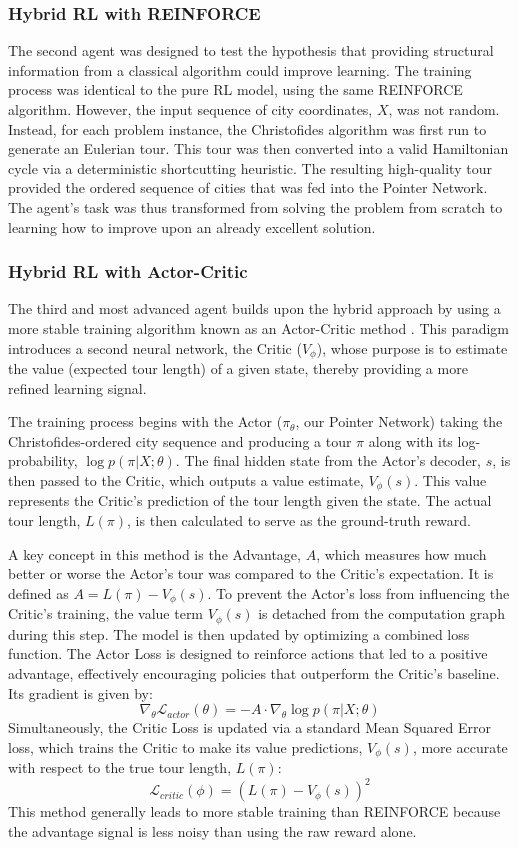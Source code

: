 \documentclass[12pt]{article}
\theoremstyle{remarkstyle}
\begin{document}
\subsubsection{Hybrid RL with REINFORCE}
The second agent was designed to test the hypothesis that providing structural information from a classical algorithm could improve learning. The training process was identical to the pure RL model, using the same REINFORCE algorithm. However, the input sequence of city coordinates, $X$, was not random. Instead, for each problem instance, the Christofides algorithm was first run to generate an Eulerian tour. This tour was then converted into a valid Hamiltonian cycle via a deterministic shortcutting heuristic. The resulting high-quality tour provided the ordered sequence of cities that was fed into the Pointer Network. The agent's task was thus transformed from solving the problem from scratch to learning how to improve upon an already excellent solution.

\subsubsection{Hybrid RL with Actor-Critic}
The third and most advanced agent builds upon the hybrid approach by using a more stable training algorithm known as an Actor-Critic method \cite{sutton1998reinforcement}. This paradigm introduces a second neural network, the Critic ($V_\phi$), whose purpose is to estimate the value (expected tour length) of a given state, thereby providing a more refined learning signal.

The training process begins with the Actor ($\pi_\theta$, our Pointer Network) taking the Christofides-ordered city sequence and producing a tour $\pi$ along with its log-probability, $\log p(\pi | X; \theta)$. The final hidden state from the Actor's decoder, $s$, is then passed to the Critic, which outputs a value estimate, $V_\phi(s)$. This value represents the Critic's prediction of the tour length given the state. The actual tour length, $L(\pi)$, is then calculated to serve as the ground-truth reward.

A key concept in this method is the Advantage, $A$, which measures how much better or worse the Actor's tour was compared to the Critic's expectation. It is defined as $A = L(\pi) - V_\phi(s)$. To prevent the Actor's loss from influencing the Critic's training, the value term $V_\phi(s)$ is detached from the computation graph during this step. The model is then updated by optimizing a combined loss function. The Actor Loss is designed to reinforce actions that led to a positive advantage, effectively encouraging policies that outperform the Critic's baseline. Its gradient is given by:
$$ \nabla_\theta \mathcal{L}_{actor}(\theta) = -A \cdot \nabla_\theta \log p(\pi | X; \theta) $$
Simultaneously, the Critic Loss is updated via a standard Mean Squared Error loss, which trains the Critic to make its value predictions, $V_\phi(s)$, more accurate with respect to the true tour length, $L(\pi)$:
$$ \mathcal{L}_{critic}(\phi) = (L(\pi) - V_\phi(s))^2 $$
This method generally leads to more stable training than REINFORCE because the advantage signal is less noisy than using the raw reward alone.
\end{document}

